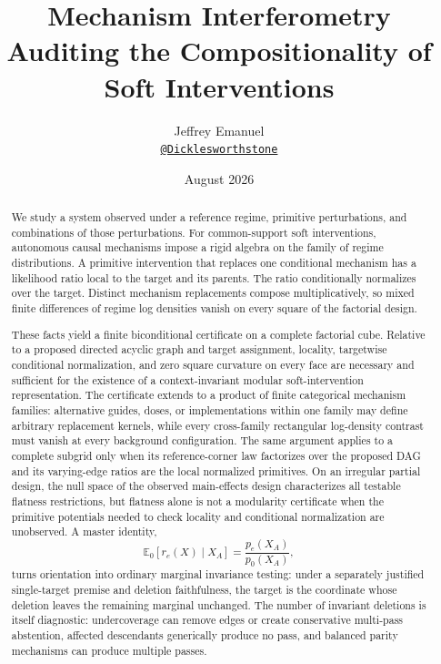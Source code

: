 \documentclass[11pt]{article}
\title{\textbf{Mechanism Interferometry}\\[0.35em]
\large Auditing the Compositionality of Soft Interventions}
\author{Jeffrey Emanuel\\
\small \href{https://github.com/Dicklesworthstone}{\texttt{@Dicklesworthstone}}}
\date{August 2026}
\newcommand{\E}{\mathbb{E}}
\begin{document}
\maketitle

\begin{abstract}
We study a system observed under a reference regime, primitive perturbations, and combinations of those perturbations.  For common-support soft interventions, autonomous causal mechanisms impose a rigid algebra on the family of regime distributions.  A primitive intervention that replaces one conditional mechanism has a likelihood ratio local to the target and its parents.  The ratio conditionally normalizes over the target.  Distinct mechanism replacements compose multiplicatively, so mixed finite differences of regime log densities vanish on every square of the factorial design.

These facts yield a finite biconditional certificate on a complete factorial cube.  Relative to a proposed directed acyclic graph and target assignment, locality, targetwise conditional normalization, and zero square curvature on every face are necessary and sufficient for the existence of a context-invariant modular soft-intervention representation.  The certificate extends to a product of finite categorical mechanism families: alternative guides, doses, or implementations within one family may define arbitrary replacement kernels, while every cross-family rectangular log-density contrast must vanish at every background configuration.  The same argument applies to a complete subgrid only when its reference-corner law factorizes over the proposed DAG and its varying-edge ratios are the local normalized primitives.  On an irregular partial design, the null space of the observed main-effects design characterizes all testable flatness restrictions, but flatness alone is not a modularity certificate when the primitive potentials needed to check locality and conditional normalization are unobserved.  A master identity,
\[
\E_0[r_e(X)\mid X_A]=\frac{p_e(X_A)}{p_0(X_A)},
\]
turns orientation into ordinary marginal invariance testing: under a separately justified single-target premise and deletion faithfulness, the target is the coordinate whose deletion leaves the remaining marginal unchanged.  The number of invariant deletions is itself diagnostic: undercoverage can remove edges or create conservative multi-pass abstention, affected descendants generically produce no pass, and balanced parity mechanisms can produce multiple passes.


\end{abstract}
\end{document}

